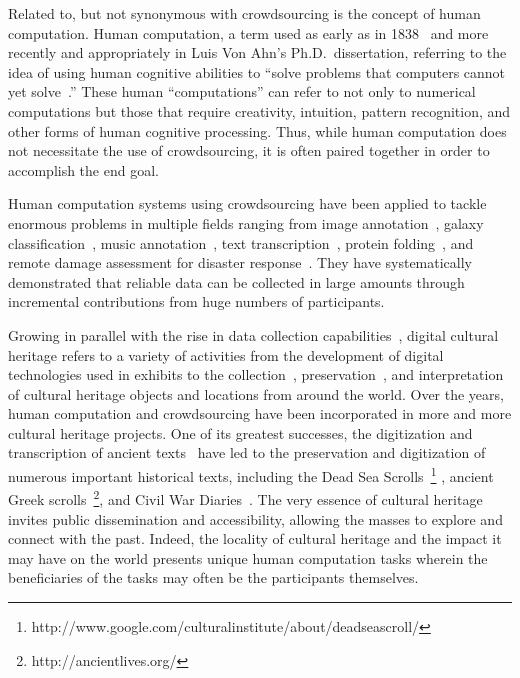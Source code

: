 \documentclass[10pt,twocolumn]{article}
\begin{document}
Related to, but not synonymous with crowdsourcing is the concept of human 
computation. Human computation, a term used as early as in 1838~\cite{Quinn2011}
and more recently and appropriately in Luis Von Ahn's Ph.D.\ dissertation, referring to the 
idea of using human cognitive abilities to ``solve problems that
computers cannot yet solve~\cite{VonAhn2009}.'' These human ``computations'' can 
refer to not only to numerical computations but those that require creativity, 
intuition, pattern recognition, and other forms of human cognitive processing. 
Thus, while human computation does not necessitate the use of crowdsourcing, it 
is often paired together in order to accomplish the end goal.

Human computation systems using crowdsourcing have been applied to tackle enormous 
problems in multiple fields ranging from image annotation~\cite{VonAhn2004}, galaxy 
classification~\cite{Lintott2008}, music annotation~\cite{Turnbull2007},
text transcription~\cite{VonAhn2008}, protein folding~\cite{Cooper2010}, 
and remote damage assessment for disaster response~\cite{Barrington2012}. They
have systematically demonstrated that reliable data can be collected in large 
amounts through incremental contributions from huge numbers of participants.

Growing in parallel with the rise in data collection 
capabilities~\cite{Crane2002}, digital cultural heritage refers to a variety of 
activities from the development of digital technologies used in exhibits to the 
collection~\cite{Proctor2010}, preservation~\cite{Chrons2011}, and 
interpretation of cultural heritage objects and locations from around the 
world. Over the years, human computation and crowdsourcing have been incorporated
in more and more cultural heritage projects. One of its greatest successes, 
the digitization and transcription of ancient texts~\cite{Owens2013,Chrons2011,VonAhn2008a}
have led to the preservation and digitization of numerous important historical 
texts, including the Dead Sea 
Scrolls~\footnote{http://www.google.com/culturalinstitute/about/deadseascroll/}
, ancient Greek scrolls~\footnote{http://ancientlives.org/}, and Civil War 
Diaries~\cite{Owens2013}. The very essence of cultural heritage invites
public dissemination and accessibility, allowing the masses to explore
and connect with the past. Indeed, the locality of cultural heritage and 
the impact it may have on the world presents unique human computation tasks wherein 
the beneficiaries of the tasks may often be the participants themselves.
\end{document}
